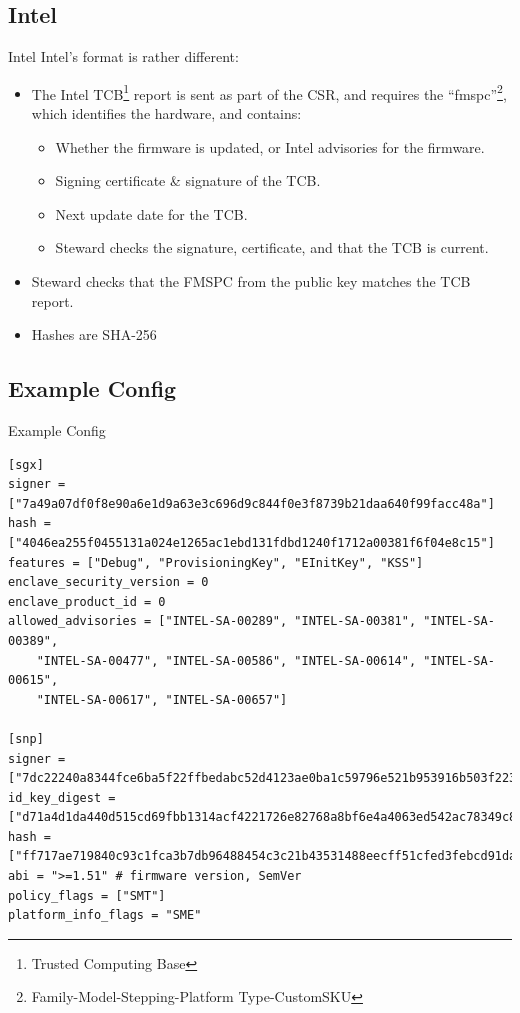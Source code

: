 \documentclass[graphics]{beamer}
\begin{document}
\subsection{Intel}
\begin{frame}{Intel}
Intel's format is rather different:
\begin{itemize}
    \item The Intel TCB\footnote{Trusted Computing Base} report is sent as part of the CSR, and requires the ``fmspc''\footnote{Family-Model-Stepping-Platform Type-CustomSKU}, which identifies the hardware, and contains:
    \begin{itemize}
        \item Whether the firmware is updated, or Intel advisories for the firmware.
        \item Signing certificate \& signature of the TCB.
        \item Next update date for the TCB.
        \item Steward checks the signature, certificate, and that the TCB is current.
    \end{itemize}
    \item Steward checks that the FMSPC from the public key matches the TCB report.
    \item Hashes are SHA-256
\end{itemize}
\end{frame}

\subsection{Example Config}
\begin{frame}[fragile]{Example Config}
    \begin{verbatim}
[sgx]
signer = ["7a49a07df0f8e90a6e1d9a63e3c696d9c844f0e3f8739b21daa640f99facc48a"]
hash = ["4046ea255f0455131a024e1265ac1ebd131fdbd1240f1712a00381f6f04e8c15"]
features = ["Debug", "ProvisioningKey", "EInitKey", "KSS"]
enclave_security_version = 0
enclave_product_id = 0
allowed_advisories = ["INTEL-SA-00289", "INTEL-SA-00381", "INTEL-SA-00389",
    "INTEL-SA-00477", "INTEL-SA-00586", "INTEL-SA-00614", "INTEL-SA-00615",
    "INTEL-SA-00617", "INTEL-SA-00657"]

[snp]
signer = ["7dc22240a8344fce6ba5f22ffbedabc52d4123ae0ba1c59796e521b953916b503f223b15c4429e7d8c5489ad71f1e193"]
id_key_digest = ["d71a4d1da440d515cd69fbb1314acf4221726e82768a8bf6e4a4063ed542ac78349c8145b4666a4242a91a374387b473"]
hash = ["ff717ae719840c93c1fca3b7db96488454c3c21b43531488eecff51cfed3febcd91da8be87a4cbcbc52a3bae770987c3"]
abi = ">=1.51" # firmware version, SemVer
policy_flags = ["SMT"]
platform_info_flags = "SME"
    \end{verbatim}
\end{frame}
\end{document}
